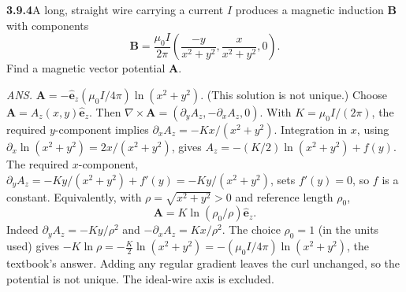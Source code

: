 
\par\bigskip
\noindent\textbf{3.9.4}\quad A long, straight wire carrying a current $I$
produces a magnetic induction $\mathbf{B}$ with components
\[
\mathbf{B}=\frac{\mu_{0}I}{2\pi}\left(\frac{-y}{x^{2}+y^{2}},
\frac{x}{x^{2}+y^{2}},0\right).
\]
Find a magnetic vector potential $\mathbf{A}$.
\par\nobreak\hfill\emph{ANS.}\enspace
$\mathbf{A}=-\hat{\mathbf{e}}_{z}(\mu_{0}I/4\pi)\ln(x^{2}+y^{2})$.\enspace
(This solution is not unique.)
\solution
Choose $\mathbf A=A_z(x,y)\hat{\mathbf e}_z$.
Then $\nabla\times\mathbf A=(\partial_yA_z,-\partial_xA_z,0)$.
With $K=\mu_0I/(2\pi)$, the required $y$-component implies
$\partial_xA_z=-Kx/(x^2+y^2)$.
Integration in $x$, using $\partial_x\ln(x^2+y^2)=2x/(x^2+y^2)$, gives
$A_z=-(K/2)\ln(x^2+y^2)+f(y)$.
The required $x$-component,
$\partial_yA_z=-Ky/(x^2+y^2)+f'(y)=-Ky/(x^2+y^2)$, sets $f'(y)=0$, so
$f$ is a constant. Equivalently, with
$\rho=\sqrt{x^2+y^2}>0$ and reference length $\rho_0$,
\[
\boxed{\mathbf A=K\ln(\rho_0/\rho)\hat{\mathbf e}_z}.
\]
Indeed $\partial_yA_z=-Ky/\rho^2$ and
$-\partial_xA_z=Kx/\rho^2$. The choice $\rho_0=1$ (in the units used)
gives $-K\ln\rho=-\frac K2\ln(x^2+y^2)
=-(\mu_0I/4\pi)\ln(x^2+y^2)$, the textbook's answer. Adding any regular
gradient leaves the curl unchanged, so the potential is not unique.
The ideal-wire axis is excluded.

